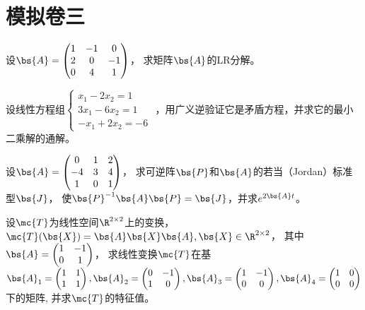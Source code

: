 \documentclass[12pt, a4paper, oneside, UTF8]{ctexbook}
\begin{document}
\else
\fi

\chapter{模拟卷三}
\begin{question} 
   设$\bs{A}=\begin{pmatrix}
    1&-1&0\\
    2&0&-1\\
    0&4&1
   \end{pmatrix}$，
   求矩阵$\bs{A}$的LR分解。
\end{question}

\begin{question}
    设线性方程组$\left\{
        \begin{array}{ll}
            x_1-2x_2=1\\
            3x_1-6x_2=1\\
            -x_1+2x_2=-6
        \end{array}
        \right.$
    ，用广义逆验证它是矛盾方程，并求它的最小二乘解的通解。
\end{question}

\begin{question}
    设$\bs{A}=\begin{pmatrix}
        0&1&2\\
        -4&3&4\\
        1&0&1
    \end{pmatrix}$，
    求可逆阵$\bs{P}$和$\bs{A}$的若当（Jordan）标准型$\bs{J}$，
    使$\bs{P}^{-1}\bs{A}\bs{P}=\bs{J}$，并求$e^{2\bs{A}t}$。
\end{question}


\begin{question}
    设$\mc{T}$为线性空间$\R^{2\times 2}$上的变换，$\mc{T}(\bs{X})=\bs{A}\bs{X}\bs{A},\bs{X} \in \R^{2\times 2}$，
    其中$\bs{A}=\begin{pmatrix}
        1&-1\\
        0&1
    \end{pmatrix}$，
    求线性变换$\mc{T}$在基$\bs{A}_1=\begin{pmatrix}
            1&1\\
            1&1
        \end{pmatrix},\bs{A}_2=\begin{pmatrix}
            0&-1\\
            1&0
        \end{pmatrix},\bs{A}_3=\begin{pmatrix}
            1&-1\\
            0&0
        \end{pmatrix},\bs{A}_4=\begin{pmatrix}
            1&0\\
            0&0
        \end{pmatrix}$下的矩阵,
        并求$\mc{T}$的特征值。
\end{question}
\end{document}
